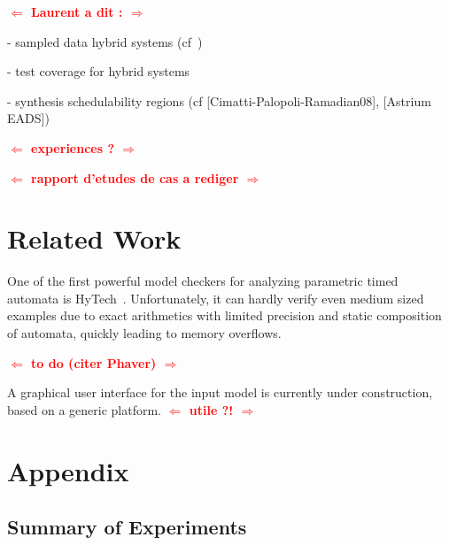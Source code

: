 \documentclass{llncs}
\newcommand{\hytech}{{\sc HyTech}}
\newcommand{\commentaire}[1]{\textcolor{red}{\textbf{$\Leftarrow$  #1 $\Rightarrow$}}}
\begin{document}
\commentaire{Laurent a dit :}

- sampled data hybrid systems (cf~\cite{FK11})

- test coverage for hybrid systems

- synthesis schedulability regions (cf [Cimatti-Palopoli-Ramadian08], [Astrium EADS])

\commentaire{experiences ?}

\commentaire{rapport d'etudes de cas a rediger}



\section{Related Work}


One of the first powerful model checkers for analyzing parametric timed automata is \hytech{}~\cite{hhw97}.
Unfortunately, it can hardly verify even medium sized examples due to exact arithmetics with limited precision and static composition of automata, quickly leading to memory overflows.

\commentaire{to do (citer Phaver)}

A graphical user interface for the input model is currently under construction, based on a generic platform. \commentaire{utile ?!}








\newpage


\appendix

\section*{Appendix}

\subsection*{Summary of Experiments}
\end{document}

